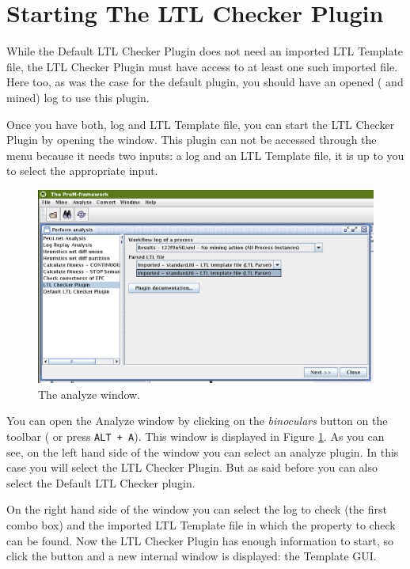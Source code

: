 \section{Starting The LTL Checker Plugin}
\label{plugingui:checker}

While the Default LTL Checker Plugin does not need an imported LTL Template
file, the LTL Checker Plugin must have access to at least one such
imported file. Here too, as was the case for the default plugin, you should
have an opened ( and mined) log to use this plugin.

Once you have both, log and LTL Template file, you can start the LTL
Checker Plugin by opening the  window. This plugin can
not be accessed through the  menu because it needs two inputs:
a log and an LTL Template file, it is up to you to select the appropriate input.

\begin{figure}[H]
    \includegraphics[scale=0.4]{images/framework-log-and-ltl-analyse-cutted.eps}
    \caption{The analyze window.}
    \label{plugingui:analysewindow}
\end{figure}

You can open the Analyze window by clicking on the \textit{binoculars} button
on the toolbar ( or press \texttt{ALT + A}). This window is displayed in
Figure \ref{plugingui:analysewindow}. As you can see, on the left hand side of
the window you can select an analyze plugin. In this case you will select the
LTL Checker Plugin. But as said before you can also select the Default LTL
Checker plugin.

On the right hand side of the window you can select the log to check (the
first combo box) and the imported LTL Template file in which the property to
check can be found. Now the LTL Checker Plugin has enough information to start, so
click the  button and a new internal window is displayed: the Template GUI.

